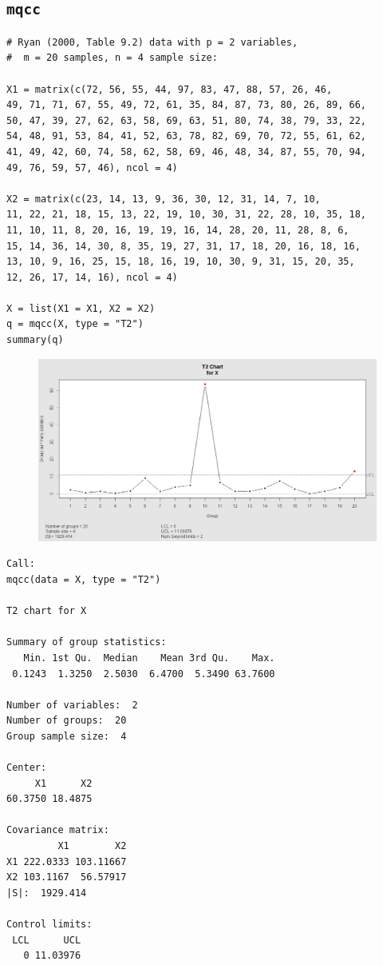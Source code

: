 \documentclass[]{article}
\begin{document}
\subsection{\texttt{mqcc}}
\begin{framed}
\begin{verbatim}
# Ryan (2000, Table 9.2) data with p = 2 variables, 
#  m = 20 samples, n = 4 sample size:

X1 = matrix(c(72, 56, 55, 44, 97, 83, 47, 88, 57, 26, 46,
49, 71, 71, 67, 55, 49, 72, 61, 35, 84, 87, 73, 80, 26, 89, 66,
50, 47, 39, 27, 62, 63, 58, 69, 63, 51, 80, 74, 38, 79, 33, 22,
54, 48, 91, 53, 84, 41, 52, 63, 78, 82, 69, 70, 72, 55, 61, 62,
41, 49, 42, 60, 74, 58, 62, 58, 69, 46, 48, 34, 87, 55, 70, 94,
49, 76, 59, 57, 46), ncol = 4)

X2 = matrix(c(23, 14, 13, 9, 36, 30, 12, 31, 14, 7, 10,
11, 22, 21, 18, 15, 13, 22, 19, 10, 30, 31, 22, 28, 10, 35, 18,
11, 10, 11, 8, 20, 16, 19, 19, 16, 14, 28, 20, 11, 28, 8, 6,
15, 14, 36, 14, 30, 8, 35, 19, 27, 31, 17, 18, 20, 16, 18, 16,
13, 10, 9, 16, 25, 15, 18, 16, 19, 10, 30, 9, 31, 15, 20, 35,
12, 26, 17, 14, 16), ncol = 4)

X = list(X1 = X1, X2 = X2)
q = mqcc(X, type = "T2")
summary(q)
\end{verbatim}
\end{framed}
\begin{figure}[h!]
\centering
\includegraphics[width=0.9\linewidth]{./mqccplot1}
\caption{}
\label{fig:mqccplot1}
\end{figure}
\newpage
\begin{verbatim}
Call:
mqcc(data = X, type = "T2")

T2 chart for X 

Summary of group statistics:
   Min. 1st Qu.  Median    Mean 3rd Qu.    Max. 
 0.1243  1.3250  2.5030  6.4700  5.3490 63.7600 

Number of variables:  2
Number of groups:  20
Group sample size:  4

Center: 
     X1      X2 
60.3750 18.4875 

Covariance matrix:
         X1        X2
X1 222.0333 103.11667
X2 103.1167  56.57917
|S|:  1929.414 

Control limits:
 LCL      UCL
   0 11.03976

\end{verbatim}
\end{document}
